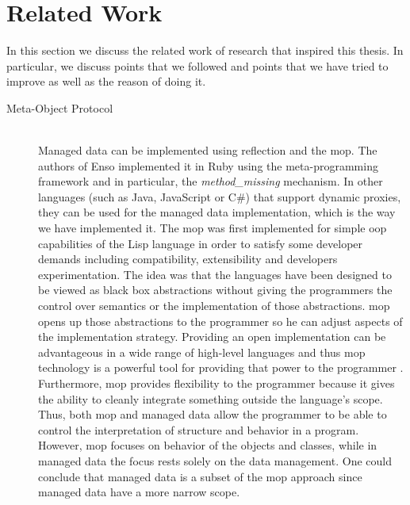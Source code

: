 \section{Related Work}\label{Related Work}
In this section we discuss the related work of research that inspired this thesis.
In particular, we discuss points that we followed and points that we have tried to improve as well as the reason of doing it.

\begin{description}

  \item[Meta-Object Protocol]~\\
  Managed data can be implemented using reflection and the \ac{mop}. 
  The authors of Enso \cite{loh2012managed} implemented it in Ruby using the meta-programming framework and in particular, the \textit{method\_missing} mechanism. 
  In other languages (such as Java, JavaScript or C\#) that support dynamic proxies, they can be used for the managed data implementation, which is the way we have implemented it.
  The \ac{mop} \cite{kiczales1991art} was first implemented for simple \ac{oop} capabilities of the Lisp language in order to satisfy some developer demands including compatibility, extensibility and developers experimentation. 
  The idea was that the languages have been designed to be viewed as black box abstractions without giving the programmers the control over semantics or the implementation of those abstractions. 
  \ac{mop} opens up those abstractions to the programmer so he can adjust aspects of the implementation strategy. 
  Providing an open implementation can be advantageous in a wide range of high-level languages and thus \ac{mop} technology is a powerful tool for providing that power to the programmer \cite{kiczales1991art}.
  Furthermore, \ac{mop} provides flexibility to the programmer because it gives the ability to cleanly integrate something outside the language's scope. 
  Thus, both \ac{mop} and managed data allow the programmer to be able to control the interpretation of structure and behavior in a program.
  However, \ac{mop} focuses on behavior of the objects and classes, while in managed data the focus rests solely on the data management.
  One could conclude that managed data is a subset of the \ac{mop} approach since managed data have a more narrow scope.


\end{description}
